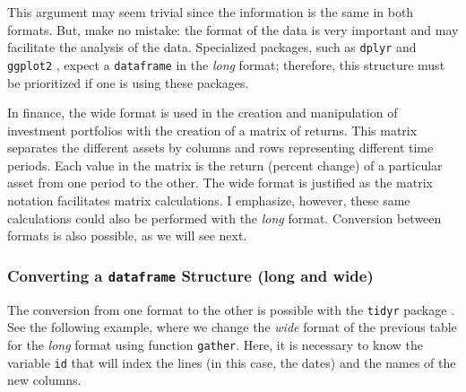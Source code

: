 \documentclass[11pt,]{book}
\begin{document}
This argument may seem trivial since the information is the same in both
formats. But, make no mistake: the format of the data is very important
and may facilitate the analysis of the data. Specialized packages, such
as \texttt{dplyr} \citep{dplyr} and \texttt{ggplot2}
\citep{wickham2009ggplot2}, expect a \texttt{dataframe} in the
\emph{long} format; therefore, this structure must be prioritized if one
is using these packages.

In finance, the wide format is used in the creation and manipulation of
investment portfolios with the creation of a matrix of returns. This
matrix separates the different assets by columns and rows representing
different time periods. Each value in the matrix is the return (percent
change) of a particular asset from one period to the other. The wide
format is justified as the matrix notation facilitates matrix
calculations. I emphasize, however, these same calculations could also
be performed with the \emph{long} format. Conversion between formats is
also possible, as we will see next.

\subsubsection{\texorpdfstring{Converting a \texttt{dataframe} Structure
(long and
wide)}{Converting a dataframe Structure (long and wide)}}\label{converting-a-dataframe-structure-long-and-wide}

The conversion from one format to the other is possible with the
\texttt{tidyr} package \citep{tidyr}. See the following example, where
we change the \emph{wide} format of the previous table for the
\emph{long} format using function \texttt{gather}. Here, it is necessary
to know the variable \texttt{id} that will index the lines (in this
case, the dates) and the names of the new columns. 
\end{document}
